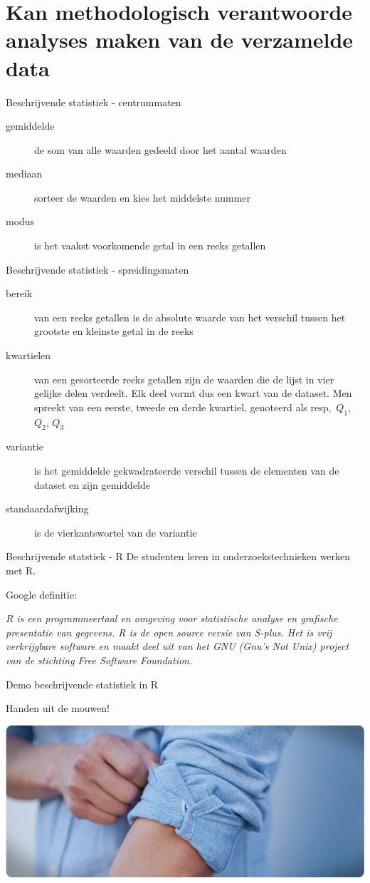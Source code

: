 \section{Kan methodologisch verantwoorde analyses maken van de verzamelde data }
\sectionframe{}

\begin{frame}{Beschrijvende statistiek - centrummaten}
	
	\begin{description}
		\item[gemiddelde] de som van alle waarden gedeeld door het aantal waarden
		\item[mediaan] sorteer de waarden en kies het middelste nummer
		\item[modus] is het vaakst voorkomende getal in een reeks getallen
	\end{description}
\end{frame}

\begin{frame}{Beschrijvende statistiek - spreidingsmaten}
	\begin{description}
		\item[bereik] van een reeks getallen is de absolute waarde van het verschil tussen het grootste en kleinste getal in de reeks
		\item[kwartielen] van een gesorteerde reeks getallen zijn de waarden die de lijst in vier gelijke delen verdeelt. Elk deel vormt dus een kwart van de dataset. Men spreekt van een eerste, tweede en derde kwartiel, genoteerd als resp,~$Q_1$, $Q_2$, $Q_3$
		\item[variantie] is het gemiddelde gekwadrateerde verschil tussen de elementen van de dataset en zijn gemiddelde
		\item[standaardafwijking] is de vierkantswortel van de variantie
	\end{description}
\end{frame}

\begin{frame}{Beschrijvende statstiek - R}
	De studenten leren in onderzoekstechnieken werken met R.
	
	Google definitie: 
	\begin{center}
		\textit{R is een programmeertaal en omgeving voor statistische analyse en grafische presentatie van gegevens. R is de open source versie van S-plus. Het is vrij verkrijgbare software en maakt deel uit van het GNU (Gnu's Not Unix) project van de stichting Free Software Foundation.}
	\end{center}
\end{frame}

\begin{frame}{Demo beschrijvende statistiek in R}
\begin{center}
		Handen uit de mouwen! 
\end{center}
\includegraphics[width=\textwidth]{img/handen.png}
\end{frame}